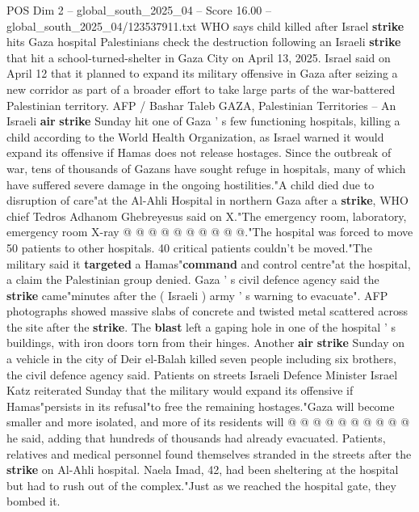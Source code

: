 \begin{textsample}{POS Dim 2 – global\_south\_2025\_04 – Score 16.00 – global\_south\_2025\_04/123537911.txt}  \label{ex:f2_pos_343}
WHO says child killed after Israel \textbf{strike} hits Gaza hospital Palestinians check the destruction following an Israeli \textbf{strike} that hit a school-turned-shelter in Gaza City on April 13, 2025.
Israel said on April 12 that it planned to expand its military offensive in Gaza after seizing a new corridor as part of a broader effort to take large parts of the war-battered Palestinian territory.
AFP / Bashar Taleb GAZA, Palestinian Territories -- An Israeli \textbf{air} \textbf{strike} Sunday hit one of Gaza ' s few functioning hospitals, killing a child according to the World Health Organization, as Israel warned it would expand its offensive if Hamas does not release hostages.
Since the outbreak of war, tens of thousands of Gazans have sought refuge in hospitals, many of which have suffered severe damage in the ongoing hostilities."A child died due to disruption of care"at the Al-Ahli Hospital in northern Gaza after a \textbf{strike}, WHO chief Tedros Adhanom Ghebreyesus said on X."The emergency room, laboratory, emergency room X-ray @ @ @ @ @ @ @ @ @ @."The hospital was forced to move 50 patients to other hospitals. 40 critical patients couldn't be moved."The military said it \textbf{targeted} a Hamas"\textbf{command} and control centre"at the hospital, a claim the Palestinian group denied.
Gaza ' s civil defence agency said the \textbf{strike} came"minutes after the ( Israeli ) army ' s warning to evacuate".
AFP photographs showed massive slabs of concrete and twisted metal scattered across the site after the \textbf{strike}.
The \textbf{blast} left a gaping hole in one of the hospital ' s buildings, with iron doors torn from their hinges.
Another \textbf{air} \textbf{strike} Sunday on a vehicle in the city of Deir el-Balah killed seven people including six brothers, the civil defence agency said.
Patients on streets Israeli Defence Minister Israel Katz reiterated Sunday that the military would expand its offensive if Hamas"persists in its refusal"to free the remaining hostages."Gaza will become smaller and more isolated, and more of its residents will @ @ @ @ @ @ @ @ @ @ he said, adding that hundreds of thousands had already evacuated.
Patients, relatives and medical personnel found themselves stranded in the streets after the \textbf{strike} on Al-Ahli hospital.
Naela Imad, 42, had been sheltering at the hospital but had to rush out of the complex."Just as we reached the hospital gate, they bombed it.

\end{textsample}
